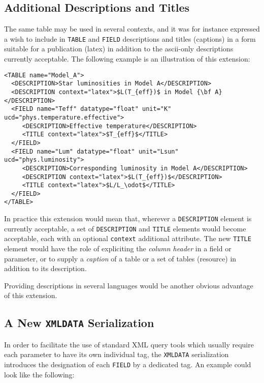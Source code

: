 \documentclass[11pt,a4paper]{ivoa}
\let\fg=\color
\def\attr#1{{\tt{\fg{DarkRed}#1}}}
\def\elem#1{{\tt{\fg{DarkRed}#1}}}
\begin{document}
{{{\subsection{Additional Descriptions and Titles}
\label{sec:addesc}
The same table may be used in several contexts, and it was for
instance expressed a wish to include in \elem{TABLE}  and
\elem{FIELD} descriptions and titles (captions) in a form
suitable for a publication (latex)
in addition to the ascii-only descriptions currently acceptable.
The following example is an illustration of this extension:
\begin{verbatim}
<TABLE name="Model_A">
  <DESCRIPTION>Star luminosities in Model A</DESCRIPTION>
  <DESCRIPTION context="latex">$L(T_{eff})$ in Model {\bf A}</DESCRIPTION>
  <FIELD name="Teff" datatype="float" unit="K" ucd="phys.temperature.effective">
     <DESCRIPTION>Effective temperature</DESCRIPTION>
     <TITLE context="latex">$T_{eff}$</TITLE>
  </FIELD>
  <FIELD name="Lum" datatype="float" unit="Lsun" ucd="phys.luminosity">
     <DESCRIPTION>Corresponding luminosity in Model A</DESCRIPTION>
     <DESCRIPTION context="latex">$L(T_{eff})$</DESCRIPTION>
     <TITLE context="latex">$L/L_\odot$</TITLE>
  </FIELD>
</TABLE>
\end{verbatim}

In practice this extension would mean that, wherever a \elem{DESCRIPTION}
element is currently acceptable, a set of \elem{DESCRIPTION} and
\elem{TITLE} elements would become acceptable, each with an optional
\attr{context} additional attribute. The new \elem{TITLE} element
would have the role of expliciting the {\em column header} in a
field or parameter, or to supply a {\em caption} of a table or
a set of tables (resource) in addition to its description.

Providing descriptions in several languages would be another
obvious advantage of this extension.

\subsection{A New {\tt XMLDATA} Serialization}
In order to facilitate the  use of standard XML query tools
which usually require each parameter to have its own individual tag,
the \elem{XMLDATA} serialization introduces the designation of
each  \elem{FIELD} by a dedicated tag. An example could look like
the following:

}}}
\end{document}
